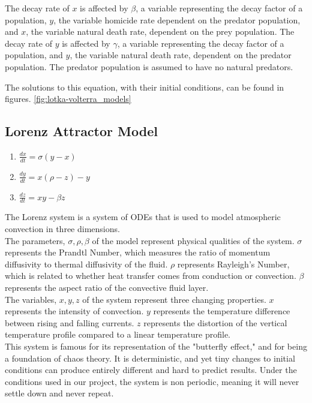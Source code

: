 \documentclass[11pt]{article}
\begin{document}
\noindent The decay rate of $x$ is affected by $\beta$, a variable representing the decay factor of a population, $y$, the variable homicide rate dependent on the predator population, and $x$, the variable natural death rate, dependent on the prey population.  The decay rate of $y$ is affected by $\gamma$, a variable representing the decay factor of a population, and $y$, the variable natural death rate, dependent on the predator population.  The predator population is assumed to have no natural predators.\newline

\noindent The solutions to this equation, with their initial conditions, can be found in figures. \ref{fig:lotka-volterra_models}


\subsection{Lorenz Attractor Model\cite{lorenz1963}} 
\begin{enumerate}
    \item $\frac{dx}{dt}=\sigma(y-x)$
    \item $\frac{dy}{dt}=x(\rho-z)-y$
    \item $\frac{dz}{dt}=xy-\beta z$
\end{enumerate}

\noindent The Lorenz system is a system of ODEs that is used to model atmospheric convection in three dimensions. \\

\noindent The parameters, $\sigma, \rho, \beta$ of the model represent physical qualities of the system. $\sigma$ represents the Prandtl Number, which measures the ratio of momentum diffusivity to thermal diffusivity of the fluid. $\rho$ represents Rayleigh's Number, which is related to whether heat transfer comes from conduction or convection. $\beta$ represents the aspect ratio of the convective fluid layer. \\

\noindent The variables, $x, y, z$ of the system represent three changing properties. $x$ represents the intensity of convection. $y$ represents the temperature difference between rising and falling currents. $z$ represents the distortion of the vertical temperature profile compared to a linear temperature profile.\\

\noindent This system is famous for its representation of the "butterfly effect," and for being a foundation of chaos theory. It is deterministic, and yet tiny changes to initial conditions can produce entirely different and hard to predict results. Under the conditions used in our project, the system is non periodic, meaning it will never settle down and never repeat. \\
\end{document}
